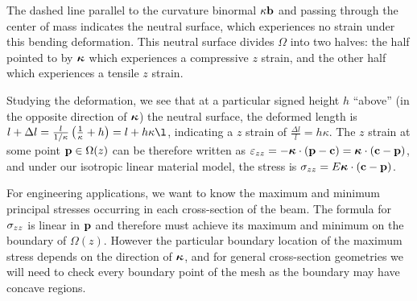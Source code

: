 \documentclass[10pt]{article}
\begin{document}
\noindent
The dashed line parallel to the curvature binormal $\kappa {\bf b}$ and passing through the
center of mass indicates the neutral surface, which experiences no strain under
this bending deformation. This neutral surface divides $\Omega$ into two
halves: the half pointed to by $\bm{\kappa}$ which experiences a compressive
$z$ strain, and the other half which experiences a tensile $z$ strain.

Studying the deformation, we see that at a particular signed height $h$ ``above'' (in the opposite direction of $\bm{\kappa}$) the
neutral surface, the deformed length is $l + \Delta l = \frac{l}{1 / \kappa} \left(\frac{1}{\kappa} + h\right) = l + h \kappa \l$,
indicating a $z$ strain of $\frac{\Delta l}{l} = h \kappa$.
The $z$ strain at some point ${\bf p} \in \Omega(z)$ can be therefore written as
$\varepsilon_{zz} = -\bm{\kappa} \cdot ({\bf p} - {\bf c}) = \bm{\kappa} \cdot ({\bf c} - {\bf p})$, and under our isotropic linear material
model, the stress is $\sigma_{zz} = E \bm{\kappa} \cdot ({\bf c} - {\bf p})$.

For engineering applications, we want to know the maximum and minimum principal stresses occurring in each
cross-section of the beam. The formula for $\sigma_{zz}$ is linear in ${\bf p}$ and therefore must
achieve its maximum and minimum on the boundary of $\Omega(z)$. However the
particular boundary location of the maximum stress depends on the direction of
$\bm{\kappa}$, and for general cross-section geometries we will need to check every
boundary point of the mesh as the boundary may have concave regions.
\end{document}
